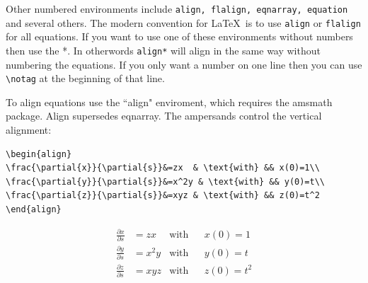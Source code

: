 Other numbered environments include \texttt{align, flalign, eqnarray, equation} and
several others.  The modern convention for \LaTeX\ is to use \texttt{align}   or
\texttt{flalign} for all equations.  If you want to use one of these environments without
numbers then use the *.  In otherwords \texttt{align*}  will align in the same way without
numbering the equations.  If you only want a number on one line then you can
use \verb|\notag|  at the beginning of that line.

To align equations use the ``align" enviroment, which requires the amsmath package. Align
supersedes eqnarray. The ampersands control the vertical alignment:
\begin{verbatim}
\begin{align}
\frac{\partial{x}}{\partial{s}}&=zx  & \text{with} && x(0)=1\\
\frac{\partial{y}}{\partial{s}}&=x^2y & \text{with} && y(0)=t\\
\frac{\partial{z}}{\partial{s}}&=xyz & \text{with} && z(0)=t^2
\end{align}
\end{verbatim}

\begin{align}
\frac{\partial{x}}{\partial{s}}&=zx  & \text{with} && x(0)=1\\
\frac{\partial{y}}{\partial{s}}&=x^2y & \text{with} && y(0)=t\\
\frac{\partial{z}}{\partial{s}}&=xyz & \text{with} && z(0)=t^2
\end{align}



